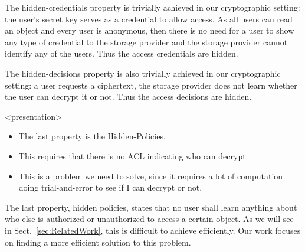 The hidden-credentials property is trivially achieved in our cryptographic 
setting: the user's secret key serves as a credential to allow access.
As all users can read an object and every user is anonymous, then there is no 
need for a user to show any type of credential to the storage provider and the 
storage provider cannot identify any of the users.
Thus the access credentials are hidden.

%
%
%
%

The hidden-decisions property is also trivially achieved in our cryptographic 
setting: a user requests a ciphertext, the storage provider does not learn 
whether the user can decrypt it or not.
Thus the access decisions are hidden.

\begin{frame}<presentation>
  \begin{itemize}

    \item The last property is the Hidden-Policies.
      
    \item This requires that there is no \ac{ACL} indicating who can decrypt.

    \item This is a problem we need to solve, since it requires a lot of 
      computation doing trial-and-error to see if I can decrypt or not.

  \end{itemize}
\end{frame}

The last property, hidden policies, states that no user shall learn anything 
about who else is authorized or unauthorized to access a certain object.
As we will see in Sect.~\ref{sec:RelatedWork}, this is difficult to achieve 
efficiently.
Our work focuses on finding a more efficient solution to this problem.

